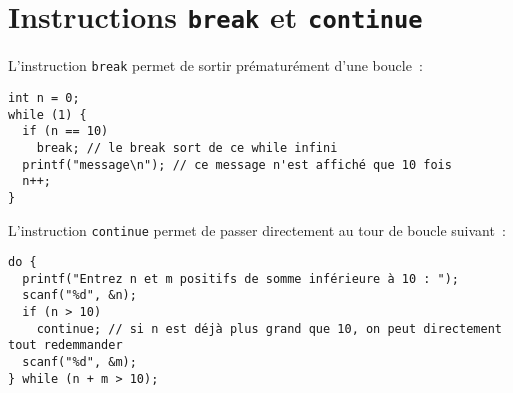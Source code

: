 \documentclass[a4paper,10pt]{article}
\begin{document}
  \section{Instructions \texttt{break} et \texttt{continue}}
  L'instruction \texttt{break} permet de sortir prématurément d'une boucle~:
  \begin{verbatim}
int n = 0;
while (1) {
  if (n == 10)
    break; // le break sort de ce while infini
  printf("message\n"); // ce message n'est affiché que 10 fois
  n++;
}
  \end{verbatim}
  L'instruction \texttt{continue} permet de passer directement au tour de boucle suivant~:
  \begin{verbatim}
do {
  printf("Entrez n et m positifs de somme inférieure à 10 : ");
  scanf("%d", &n);
  if (n > 10)
    continue; // si n est déjà plus grand que 10, on peut directement tout redemmander
  scanf("%d", &m);
} while (n + m > 10);
  \end{verbatim}
  
\end{document}
